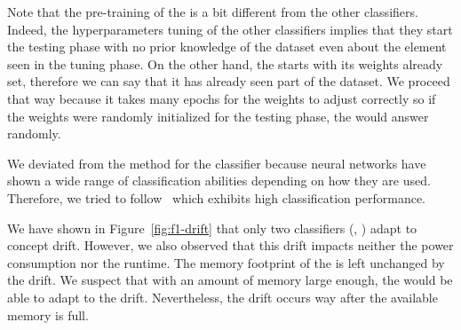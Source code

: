 Note that the pre-training of the \FNN is a bit different from the other
classifiers. Indeed, the hyperparameters tuning of the other classifiers
implies that they start the testing phase with no prior knowledge of the
dataset even about the element seen in the tuning phase. On the other hand, the
\FNN starts with its weights already set, therefore we can say that it has
already seen part of the dataset. We proceed that way because it takes many
epochs for the weights to adjust correctly so if the weights were randomly
initialized for the testing phase, the \FNN would answer randomly.

We deviated from the method for the \FNN classifier because neural networks have
shown a wide range of classification abilities depending on how they are used.
Therefore, we tried to follow~\cite{omid_2019} which exhibits high classification
performance.

We have shown in Figure~\ref{fig:f1-drift} that only two classifiers
(\hoeffdingtree, \mcnn) adapt to concept drift. However, we also observed
that this drift impacts neither the power consumption nor the runtime.
The memory footprint of the \hoeffdingtree is left unchanged by the drift.
We suspect that with an amount of memory large enough, the \mondrianforest would
be able to adapt to the drift. Nevertheless, the drift occurs way after the
available memory is full.
